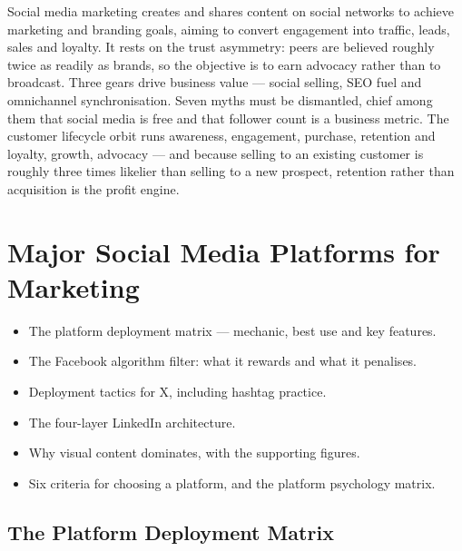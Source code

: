 \documentclass{MMTextbook}
\begin{document}
\begin{summarybox}
Social media marketing creates and shares content on social networks to achieve
marketing and branding goals, aiming to convert engagement into traffic, leads,
sales and loyalty. It rests on the trust asymmetry: peers are believed roughly
twice as readily as brands, so the objective is to earn advocacy rather than to
broadcast. Three gears drive business value --- social selling, SEO fuel and
omnichannel synchronisation. Seven myths must be dismantled, chief among them
that social media is free and that follower count is a business metric. The
customer lifecycle orbit runs awareness, engagement, purchase, retention and
loyalty, growth, advocacy --- and because selling to an existing customer is
roughly three times likelier than selling to a new prospect, retention rather
than acquisition is the profit engine.
\end{summarybox}

\chapter{Major Social Media Platforms for Marketing}


\begin{learningoutcomes}
\begin{itemize}
\item The platform deployment matrix --- mechanic, best use and key features.
\item The Facebook algorithm filter: what it rewards and what it penalises.
\item Deployment tactics for X, including hashtag practice.
\item The four-layer LinkedIn architecture.
\item Why visual content dominates, with the supporting figures.
\item Six criteria for choosing a platform, and the platform psychology matrix.
\end{itemize}
\end{learningoutcomes}

\section{The Platform Deployment Matrix}
\end{document}
